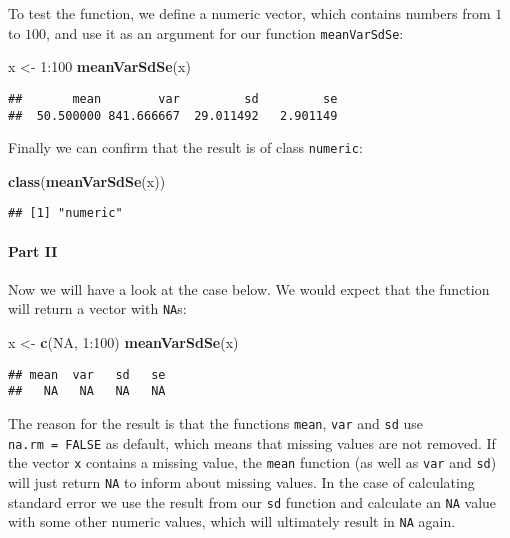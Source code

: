 \documentclass[11,]{article}
\newenvironment{Shaded}{\begin{snugshade}}{\end{snugshade}}
\newcommand{\KeywordTok}[1]{\textcolor[rgb]{0.13,0.29,0.53}{\textbf{{#1}}}}
\newcommand{\DecValTok}[1]{\textcolor[rgb]{0.00,0.00,0.81}{{#1}}}
\newcommand{\StringTok}[1]{\textcolor[rgb]{0.31,0.60,0.02}{{#1}}}
\newcommand{\OtherTok}[1]{\textcolor[rgb]{0.56,0.35,0.01}{{#1}}}
\newcommand{\NormalTok}[1]{{#1}}
\let\oldparagraph\paragraph
\renewcommand{\paragraph}[1]{\oldparagraph{#1}\mbox{}}
\begin{document}
To test the function, we define a numeric vector, which contains numbers
from \(1\) to \(100\), and use it as an argument for our function
\texttt{meanVarSdSe}:

\begin{Shaded}
\begin{Highlighting}[]
\NormalTok{x <-}\StringTok{ }\DecValTok{1}\NormalTok{:}\DecValTok{100}
\KeywordTok{meanVarSdSe}\NormalTok{(x)}
\end{Highlighting}
\end{Shaded}

\begin{verbatim}
##       mean        var         sd         se 
##  50.500000 841.666667  29.011492   2.901149
\end{verbatim}

Finally we can confirm that the result is of class \texttt{numeric}:

\begin{Shaded}
\begin{Highlighting}[]
\KeywordTok{class}\NormalTok{(}\KeywordTok{meanVarSdSe}\NormalTok{(x))}
\end{Highlighting}
\end{Shaded}

\begin{verbatim}
## [1] "numeric"
\end{verbatim}

\paragraph{Part II}\label{part-ii}

Now we will have a look at the case below. We would expect that the
function will return a vector with \texttt{NA}s:

\begin{Shaded}
\begin{Highlighting}[]
\NormalTok{x <-}\StringTok{ }\KeywordTok{c}\NormalTok{(}\OtherTok{NA}\NormalTok{, }\DecValTok{1}\NormalTok{:}\DecValTok{100}\NormalTok{)}
\KeywordTok{meanVarSdSe}\NormalTok{(x)}
\end{Highlighting}
\end{Shaded}

\begin{verbatim}
## mean  var   sd   se 
##   NA   NA   NA   NA
\end{verbatim}

The reason for the result is that the functions \texttt{mean},
\texttt{var} and \texttt{sd} use \texttt{na.rm\ =\ FALSE} as default,
which means that missing values are not removed. If the vector
\texttt{x} contains a missing value, the \texttt{mean} function (as well
as \texttt{var} and \texttt{sd}) will just return \texttt{NA} to inform
about missing values. In the case of calculating standard error we use
the result from our \texttt{sd} function and calculate an \texttt{NA}
value with some other numeric values, which will ultimately result in
\texttt{NA} again.
\end{document}
